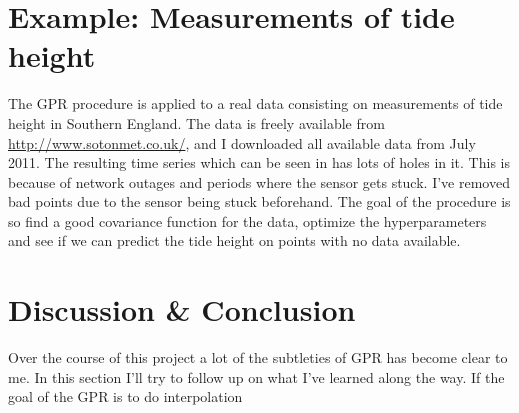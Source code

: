 \documentclass[a4paper,11pt,article,oneside]{memoir}
\begin{document}
\chapter{Example: Measurements of tide height}
\label{sec:example}

The GPR procedure is applied to a real data consisting on measurements of tide height in Southern England. The data is freely available from \url{http://www.sotonmet.co.uk/}, and I downloaded all available data from July 2011. The resulting time series which can be seen in  has lots of holes in it. This is because of network outages and periods where the sensor gets stuck. I've removed bad points due to the sensor being stuck beforehand. The goal of the procedure is so find a good covariance function for the data, optimize the hyperparameters and see if we can predict the tide height on points with no data available.



\chapter{Discussion \& Conclusion}
\label{sec:discussion}

Over the course of this project a lot of the subtleties of GPR has become clear to me. In this section I'll try to follow up on what I've learned along the way. If the goal of the GPR is to do interpolation 



\end{document}
